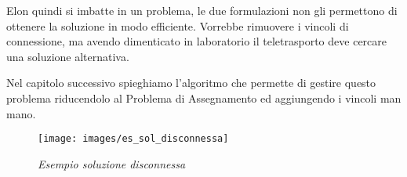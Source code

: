 Elon quindi si imbatte in un problema, le due formulazioni non gli permettono di ottenere la soluzione in modo efficiente. Vorrebbe rimuovere i vincoli di connessione, ma avendo dimenticato in laboratorio il teletrasporto deve cercare una soluzione alternativa.

Nel capitolo successivo spieghiamo l'algoritmo che permette di gestire questo problema riducendolo al Problema di Assegnamento ed aggiungendo i vincoli man mano.

\newpage

\begin{figure}[ht]
	\centering
	\texttt{[image: images/es\_sol\_disconnessa]}
	\caption{\textit{Esempio soluzione disconnessa}}
	\label{img:es_sol_disconnessa}
\end{figure}


